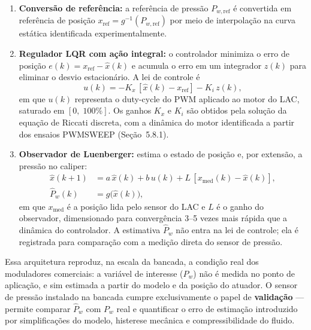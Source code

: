 \begin{enumerate}
    \item \textbf{Conversão de referência:} a referência de pressão
    $P_{w,\text{ref}}$ é convertida em referência de posição
    $x_{\text{ref}} = g^{-1}(P_{w,\text{ref}})$ por meio de interpolação
    na curva estática identificada experimentalmente.

    \item \textbf{Regulador LQR com ação integral:} o controlador minimiza
    o erro de posição $e(k) = x_{\text{ref}} - \hat{x}(k)$ e acumula o erro
    em um integrador $z(k)$ para eliminar o desvio estacionário. A lei de
    controle é
    \begin{equation}
        u(k) = -K_x\,[\hat{x}(k) - x_{\text{ref}}] - K_i\,z(k),
    \end{equation}
    em que $u(k)$ representa o duty-cycle do PWM aplicado ao motor do LAC,
    saturado em $[0,\;100\%]$. Os ganhos $K_x$ e $K_i$ são obtidos pela
    solução da equação de Riccati discreta, com a dinâmica do motor
    identificada a partir dos ensaios PWMSWEEP (Seção~5.8.1).

    \item \textbf{Observador de Luenberger:} estima o estado de posição e,
    por extensão, a pressão no caliper:
    \begin{align}
        \hat{x}(k+1) &= a\,\hat{x}(k) + b\,u(k)
                       + L\,[x_{\text{med}}(k) - \hat{x}(k)], \\
        \hat{P}_w(k)  &= g\bigl(\hat{x}(k)\bigr),
    \end{align}
    em que $x_{\text{med}}$ é a posição lida pelo sensor do LAC e $L$ é o
    ganho do observador, dimensionado para convergência 3--5 vezes mais
    rápida que a dinâmica do controlador. A estimativa $\hat{P}_w$ não
    entra na lei de controle; ela é registrada para comparação com a
    medição direta do sensor de pressão.
\end{enumerate}

Essa arquitetura reproduz, na escala da bancada, a condição real dos
moduladores comerciais: a variável de interesse ($P_w$) não é medida no
ponto de aplicação, e sim estimada a partir do modelo e da posição do
atuador. O sensor de pressão instalado na bancada cumpre exclusivamente o
papel de \textbf{validação} --- permite comparar $\hat{P}_w$ com $P_w$
real e quantificar o erro de estimação introduzido por simplificações do
modelo, histerese mecânica e compressibilidade do fluido.

